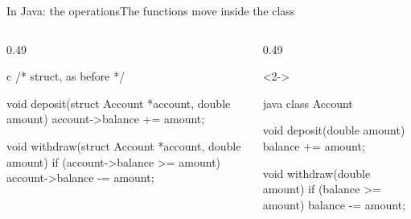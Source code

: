 \documentclass[\deckoptions]{beamer}
\begin{document}
\begin{frame}[fragile]{In Java: the operations}{The functions move inside the class}
  \begin{columns}[T, onlytextwidth]
    \begin{column}{0.49\textwidth}
\begin{codeblock}[steps={|3,7|4,8-9|}, steps from=2, diff, dense, marks={3+7/3, 4+8-9/4}]{c}
/* struct, as before */

void deposit(struct Account *account, double amount) {
    account->balance += amount;
}

void withdraw(struct Account *account, double amount) {
    if (account->balance >= amount) {
        account->balance -= amount;
    }
}
\end{codeblock}
    \end{column}
    \begin{column}{0.49\textwidth}
      \begin{uncoverenv}<2->
\begin{codeblock}[steps={|2,6|3,7-8|}, steps from=2, diff, dense, marks={2+6/3, 3+7-8/4}]{java}
class Account {
    void deposit(double amount) {
        balance += amount;
    }

    void withdraw(double amount) {
        if (balance >= amount) {
            balance -= amount;
        }
    }

}
\end{codeblock}
\end{uncoverenv}
\end{column}
\end{columns}
\end{frame}
\end{document}
